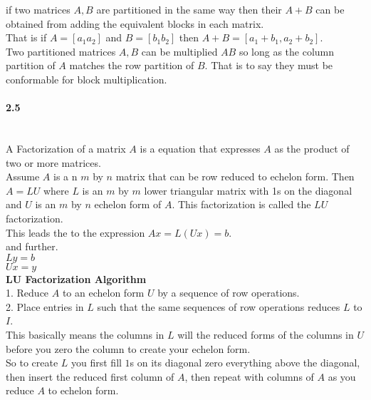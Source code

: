 \documentclass[14pt]{extreport}
\begin{document}
if two matrices $A, B$ are partitioned in the same way then their $A+B$ can be obtained from adding the equivalent blocks in each matrix.\\
That is if $A=[a_1 a_2]$ and $B = [b_1 b_2]$ then $A+B = [a_1+b_1, a_2 + b_2]$.\\

Two partitioned matrices $A,B$ can be multiplied $AB$ so long as the column partition of $A$ matches the row partition of $B$.
That is to say they must be conformable for block multiplication.\\

\paragraph{2.5}\\

A Factorization of a matrix $A$ is a equation that expresses  $A$ as the product of two or more matrices.\\

Assume $A$ is a n $m$ by $n$ matrix that can be row reduced to echelon form. Then $A=LU$ where $L$ is an $m$ by $m$ lower triangular matrix with 1s on the diagonal
and $U$ is an $m$ by $n$ echelon form of $A$. This factorization is called the $LU$ factorization.\\

This leads the to the expression $Ax=L(Ux)=b$.\\

and further.\\
$Ly=b$\\
$Ux=y$\\

\textbf{LU Factorization Algorithm}\\

1. Reduce $A$ to an echelon form $U$ by a sequence of row operations.\\
2. Place entries in $L$ such that the same sequences of row operations reduces $L$ to $I$.\\

This basically means the columns in $L$ will the reduced forms of the columns in $U$ before you zero the column to create your echelon form.\\

So to create $L$ you first fill $1$s on its diagonal zero everything above the diagonal, then insert the reduced first column of $A$, then repeat with columns of $A$ as you reduce $A$ to echelon form.\\
\end{document}
